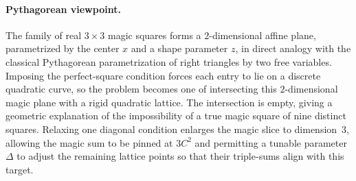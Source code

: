 \documentclass[12pt]{article}
\begin{document}
\paragraph{Pythagorean viewpoint.}
The family of real $3\times 3$ magic squares forms a $2$-dimensional affine
plane, parametrized by the center $x$ and a shape parameter $z$, in direct
analogy with the classical Pythagorean parametrization of right triangles by
two free variables.  Imposing the perfect-square condition forces each entry
to lie on a discrete quadratic curve, so the problem becomes one of
intersecting this $2$-dimensional magic plane with a rigid quadratic lattice.
The intersection is empty, giving a geometric explanation of the impossibility
of a true magic square of nine distinct squares.  Relaxing one diagonal
condition enlarges the magic slice to dimension~$3$, allowing the magic sum to
be pinned at $3C^2$ and permitting a tunable parameter $\Delta$ to adjust the
remaining lattice points so that their triple-sums align with this target.
\end{document}
